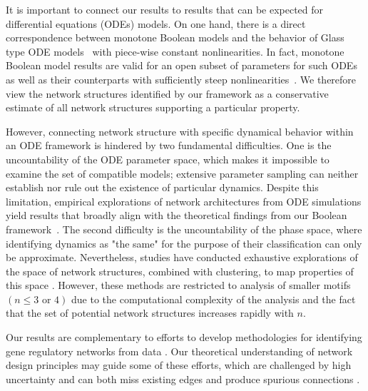 \documentclass[12pt]{amsart}
\theoremstyle{definition}
\begin{document}
It is important to connect our results to results that can be expected for differential equations (ODEs) models. 
On one hand, there is a direct correspondence between monotone Boolean models and the behavior of Glass type ODE models~\cite{cummins_combinatorial_2016, gedeon_multi-parameter_2020,glass_logical_1973,edwards_chaos_2001,edwards_modelling_2015} with piece-wise constant nonlinearities. In fact, monotone Boolean model results are valid for an open subset of parameters for such ODEs~\cite{cummins_boolean_2026} as well as their counterparts with sufficiently steep nonlinearities~\cite{gameiro_global_2024}. We therefore view the network structures identified by our framework as a conservative estimate of all network structures supporting a particular property.

However, connecting network structure with specific dynamical behavior within an ODE framework is hindered by two fundamental difficulties. One is the uncountability of the ODE parameter space, which makes it impossible to examine the set of compatible models; extensive parameter sampling can neither establish nor rule out the existence of particular dynamics. Despite this limitation, empirical explorations of network architectures from ODE simulations yield results that broadly align with the theoretical findings from our Boolean framework~\cite{rashid_operating_2025}. The second difficulty is the uncountability of the phase space, where identifying dynamics as "the same" for the purpose of their classification can only be approximate. Nevertheless, studies have conducted exhaustive explorations of the space of network structures, combined with clustering, to map properties of this space \cite{ye_enriched_2019, chakraborty_unified_2026, garayo_network_2025}. However, these methods are restricted to analysis of smaller motifs $(n\leq 3 \text{ or } 4)$ due to the computational complexity of the analysis and the fact that the set of potential network structures increases rapidly with $n$.

Our results are complementary to efforts to develop methodologies for identifying gene regulatory networks from data \cite{pratapa_benchmarking_2020,zhao_comprehensive_2021}. Our theoretical understanding of network design principles may guide some of these efforts, which are challenged by high uncertainty and can both miss existing edges and produce spurious connections \cite{maizels_gene_2026}.
\end{document}
